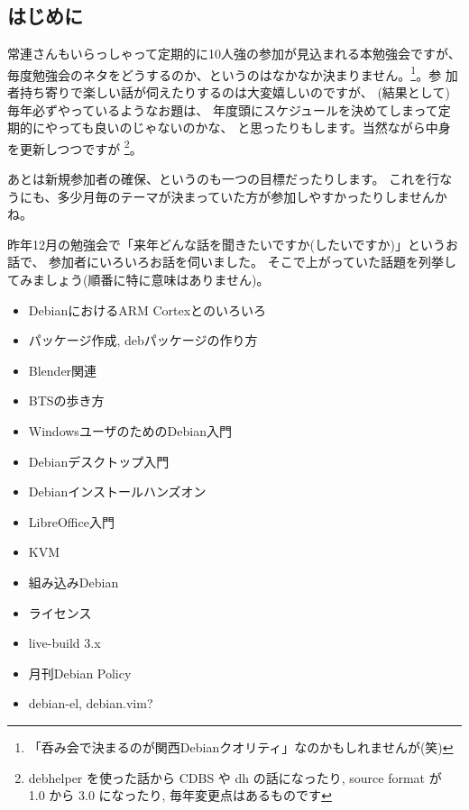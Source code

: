 \documentclass[mingoth,a4paper]{jsarticle}
\begin{document}

\subsection{はじめに}

常連さんもいらっしゃって定期的に10人強の参加が見込まれる本勉強会ですが、
毎度勉強会のネタをどうするのか、というのはなかなか決まりません。\footnote{%
  「呑み会で決まるのが関西Debianクオリティ」なのかもしれませんが(笑)}。参
加者持ち寄りで楽しい話が伺えたりするのは大変嬉しいのですが、
(結果として)毎年必ずやっているようなお題は、
年度頭にスケジュールを決めてしまって定期的にやっても良いのじゃないのかな、
と思ったりもします。当然ながら中身を更新しつつですが%
\footnote{%
  debhelper を使った話から CDBS や dh の話になったり,
  source format が 1.0 から 3.0 になったり, 毎年変更点はあるものです}。

あとは新規参加者の確保、というのも一つの目標だったりします。
これを行なうにも、多少月毎のテーマが決まっていた方が参加しやすかったりしませんかね。

昨年12月の勉強会で「来年どんな話を聞きたいですか(したいですか)」というお話で、
参加者にいろいろお話を伺いました。
%
そこで上がっていた話題を列挙してみましょう(順番に特に意味はありません)。

\vspace{1.5em}
\begin{minipage}{.45\textwidth}
  \begin{itemize}
  \item DebianにおけるARM Cortexとのいろいろ
  \item パッケージ作成, debパッケージの作り方
  \item Blender関連
  \item BTSの歩き方
  \item WindowsユーザのためのDebian入門
  \item Debianデスクトップ入門
  \item Debianインストールハンズオン
  \end{itemize}
\end{minipage}
\begin{minipage}{.45\textwidth}
  \begin{itemize}
  \item LibreOffice入門
  \item KVM
  \item 組み込みDebian
  \item ライセンス
  \item live-build 3.x
  \item 月刊Debian Policy
  \item debian-el, debian.vim?
  \end{itemize}
\end{minipage}
\vspace{1.5em}
\end{document}
